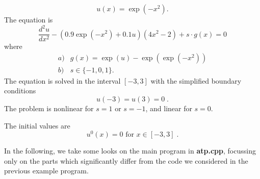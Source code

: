 \documentclass[11pt]{article}
\begin{document}
\begin{equation}\label{atpEq}
u(x) = \exp(-x^2).
\end{equation}
The equation is
\begin{equation}
 \frac{d^2u}{dx^2} - (0.9 \exp(-x^2) + 0.1u) (4x^2-2) + s\cdot g(x) = 0
\end{equation}
where
\begin{equation}\label{atpAbs}
\begin{array}{ll}
a) & g(x) = \exp(u) - \exp(\exp(-x^2)) \\[2mm]
b) & s \in \{ -1,0,1 \} .
\end{array} 
\end{equation}
The equation is solved in the interval $\left[-3,3\right]$ with the simplified boundary conditions
\begin{equation}
u(-3) = u(3) = 0 \; .
\end{equation}
The problem is nonlinear for $s=1$ or $s=-1$, and linear for $s=0$. \par
\noindent The initial values are
\begin{equation}
 u^0(x) = 0 \mbox{ \  for \  } x \in \left[-3,3\right] \; .
\end{equation}

In the following, we take some looks on the main program in {\bf atp.cpp}, focussing only on the 
parts which significantly differ from the code we considered in the previous example program. \par
\end{document}
